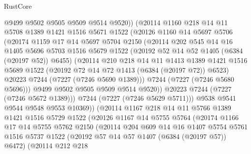 \begin{lexlean}{RustCore}
\begin{coremodule}
                @9499
                @9502
                @9505
                @9509
                @9514
                @9520))
            (@20114
              @1160
              @218
              @14
              @11
              @5708
              @1389
              @1421
              @1516
              @5671
              @1522
              (@20126
                @1160
                @14
                @5697
                @5706
                (@20174
                  @1159
                  @17
                  @14
                  @5697
                  @5704
                  @2150
                  (@20114
                    @202
                    @545
                    @14
                    @16
                    @1405
                    @5696
                    @5703
                    @1516
                    @5679
                    @1522
                    (@20192 @52 @14 @52 @1405 (@6384 (@20197 @52)) @6455)
                    (@20114
                      @210
                      @218
                      @14
                      @11
                      @1413
                      @1389
                      @1421
                      @1516
                      @5689
                      @1522
                      (@20192 @72 @14 @72 @1413 (@6384 (@20197 @72)) @6523)
                      @20223
                      @7244
                      (@7227 (@7246 @5690 @1389)))
                    @7244
                    (@7227 (@7246 @5680 @5696)))
                  @9499
                  @9502
                  @9505
                  @9509
                  @9514
                  @9520))
              @20223
              @7244
              (@7227 (@7246 @5672 @1389)))
            @7244
            (@7227 (@7246 @5629 @5711)))
          @9538
          @9541
          @9544
          @9548
          @9553
          @10369))
      (@20114
        @1167
        @218
        @14
        @11
        @5766
        @1389
        @1421
        @1516
        @5729
        @1522
        (@20126
          @1167
          @14
          @5755
          @5764
          (@20174
            @1166
            @17
            @14
            @5755
            @5762
            @2150
            (@20114
              @204
              @609
              @14
              @16
              @1407
              @5754
              @5761
              @1516
              @5737
              @1522
              (@20192 @57 @14 @57 @1407 (@6384 (@20197 @57)) @6472)
              (@20114
                @212
                @218

\end{coremodule}
\end{lexlean}
